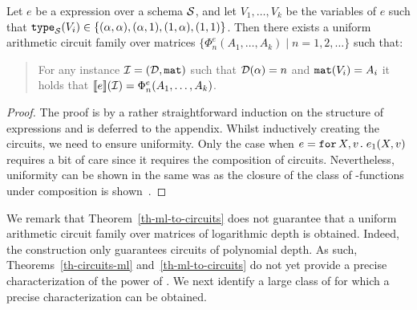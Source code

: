 
\begin{theorem}
\label{th-ml-to-circuits}
Let $e$ be a \langfor expression over a schema $\mathcal{S}$, and let $V_1,\ldots ,V_k$ be the variables of $e$ such that $\texttt{type}_{\mathcal{S}}(V_i)\in \{(\alpha,\alpha), (\alpha,1), (1,\alpha), (1,1)\}$. Then there exists a uniform arithmetic circuit family over matrices $\{\Phi_n^e(A_1,\ldots ,A_k)\mid n=1,2,\ldots\}$ such that:
\begin{quote}
	For any instance $\mathcal{I} = (\mathcal{D},\texttt{mat})$ such that $\mathcal{D}(\alpha) = n$ and $\texttt{mat}(V_i) = A_i$ it holds that $\llbracket e \rrbracket(\mathcal{I}) = \Phi_n^e(A_1,\ldots ,A_k)$.
\end{quote}	
\end{theorem}
\begin{proof}
The proof is by a rather straightforward induction on the structure of \langfor expressions and is deferred to the appendix. Whilst inductively 
creating the circuits, we need to ensure uniformity. Only the case when $e=\texttt{for}\, X,v \texttt{.}\, e_1(X, v)$ requires a bit of care since it requires the
composition of circuits. Nevertheless, uniformity can be shown in the same was as the closure of the class of \logspace-functions under composition is shown~\cite{aroraB2009}.
\end{proof}

We remark that Theorem~\ref{th-ml-to-circuits} does not guarantee that a uniform arithmetic circuit family over matrices of logarithmic depth is obtained. Indeed, the construction
only guarantees circuits of polynomial depth. As such, Theorems~\ref{th-circuits-ml} and~\ref{th-ml-to-circuits} do not yet provide a precise characterization 
of the power of \langfor. We next identify a large class of \langfor for which a precise characterization can be obtained.



